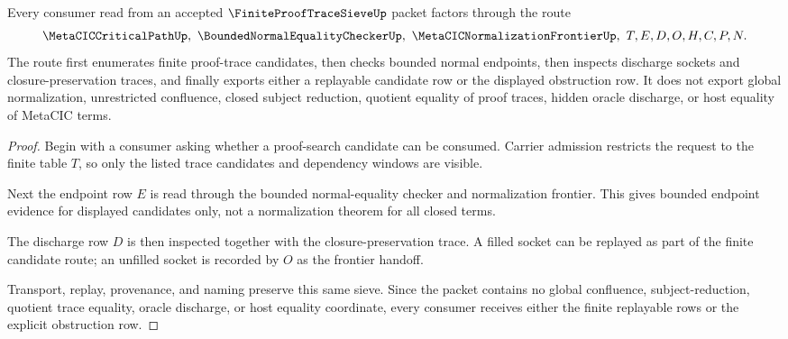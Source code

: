 \begin{theorem}
\label{thm:finite-proof-trace-sieve-frontier-handoff}
Every consumer read from an accepted $\FiniteProofTraceSieveUp$ packet factors through the route
$$
\MetaCICCriticalPathUp,\ \BoundedNormalEqualityCheckerUp,\ \MetaCICNormalizationFrontierUp,\ T,E,D,O,H,C,P,N.
$$
The route first enumerates finite proof-trace candidates, then checks bounded normal endpoints, then inspects discharge sockets and closure-preservation traces, and finally exports either a replayable candidate row or the displayed obstruction row. It does not export global normalization, unrestricted confluence, closed subject reduction, quotient equality of proof traces, hidden oracle discharge, or host equality of MetaCIC terms.
\end{theorem}
\begin{proof}
Begin with a consumer asking whether a proof-search candidate can be consumed. Carrier admission restricts the request to the finite table $T$, so only the listed trace candidates and dependency windows are visible.

Next the endpoint row $E$ is read through the bounded normal-equality checker and normalization frontier. This gives bounded endpoint evidence for displayed candidates only, not a normalization theorem for all closed terms.

The discharge row $D$ is then inspected together with the closure-preservation trace. A filled socket can be replayed as part of the finite candidate route; an unfilled socket is recorded by $O$ as the frontier handoff.

Transport, replay, provenance, and naming preserve this same sieve. Since the packet contains no global confluence, subject-reduction, quotient trace equality, oracle discharge, or host equality coordinate, every consumer receives either the finite replayable rows or the explicit obstruction row.
\end{proof}



